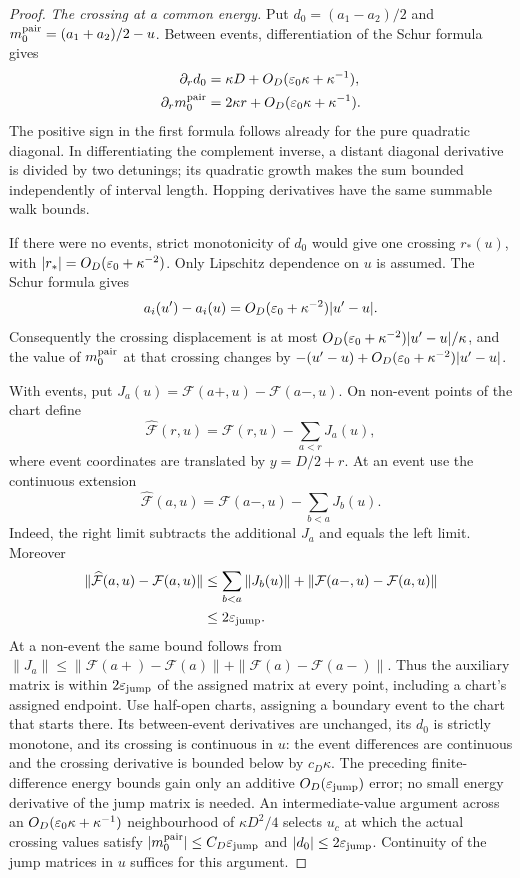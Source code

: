 \begin{proof}
\emph{The crossing at a common energy.}
Put $d_0=(a_1-a_2)/2$ and $m_0^{\rm pair}=(a_1+a_2)/2-u$.
Between events, differentiation of the Schur formula gives
\begin{align*}
 \partial_r d_0&=\kappa D+O_D(\varepsilon_0\kappa+\kappa^{-1}),\\
 \partial_r m_0^{\rm pair}&=2\kappa r+
                                     O_D(\varepsilon_0\kappa+\kappa^{-1}).
\end{align*}
The positive sign in the first formula follows already for the pure quadratic diagonal. In differentiating the complement inverse, a distant diagonal derivative is divided by two detunings; its quadratic growth makes the sum bounded independently of interval length. Hopping derivatives have the same summable walk bounds.

If there were no events, strict monotonicity of $d_0$ would give one crossing $r_*(u)$, with
$|r_*|=O_D(\varepsilon_0+\kappa^{-2})$.
Only Lipschitz dependence on $u$ is assumed. The Schur formula gives
\[
 a_i(u')-a_i(u)=O_D(\varepsilon_0+\kappa^{-2})|u'-u|.
\]
Consequently the crossing displacement is at most
$O_D(\varepsilon_0+\kappa^{-2})|u'-u|/\kappa$, and the value of $m_0^{\rm pair}$ at that crossing changes by
$-(u'-u)+O_D(\varepsilon_0+\kappa^{-2})|u'-u|$.

With events, put $J_a(u)=\mathcal F(a+,u)-\mathcal F(a-,u)$.
On non-event points of the chart define
\[
 \widehat{\mathcal F}(r,u)
 =\mathcal F(r,u)-\sum_{a<r}J_a(u),
\]
where event coordinates are translated by $y=D/2+r$.
At an event use the continuous extension
\[
 \widehat{\mathcal F}(a,u)
 =\mathcal F(a-,u)-\sum_{b<a}J_b(u).
\]
Indeed, the right limit subtracts the additional $J_a$ and equals the left limit. Moreover
\[
\begin{split}
 \|\widehat{\mathcal F}(a,u)-\mathcal F(a,u)\|
 &\le\sum_{b<a}\|J_b(u)\|
           +\|\mathcal F(a-,u)-\mathcal F(a,u)\|\\
 &\le2\varepsilon_{\rm jump}.
\end{split}
\]
At a non-event the same bound follows from
$\|J_a\|\le\|\mathcal F(a+)-\mathcal F(a)\|
+\|\mathcal F(a)-\mathcal F(a-)\|$.
Thus the auxiliary matrix is within $2\varepsilon_{\rm jump}$ of the assigned matrix at every point, including a chart's assigned endpoint. Use half-open charts, assigning a boundary event to the chart that starts there.
Its between-event derivatives are unchanged, its $d_0$ is strictly monotone, and its crossing is continuous in $u$: the event differences are continuous and the crossing derivative is bounded below by $c_D\kappa$.
The preceding finite-difference energy bounds gain only an additive $O_D(\varepsilon_{\rm jump})$ error; no small energy derivative of the jump matrix is needed. An intermediate-value argument across an
$O_D(\varepsilon_0\kappa+\kappa^{-1})$ neighbourhood of $\kappa D^2/4$ selects $u_c$ at which the actual crossing values satisfy
$|m_0^{\rm pair}|\le C_D\varepsilon_{\rm jump}$ and
$|d_0|\le2\varepsilon_{\rm jump}$.
Continuity of the jump matrices in $u$ suffices for this argument.


\end{proof}
